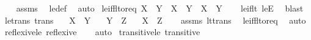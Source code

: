 \begin{isabellebody}
%
\isadelimproof
\ \ %
\endisadelimproof
%
\isatagproof
{}\isamarkupfalse%
\ assms\ \isamarkupfalse%
\ le{\isacharunderscore}{\kern0pt}def\ \isamarkupfalse%
\ auto%
\endisatagproof
{\isafoldproof}%
%
\isadelimproof
\isanewline
%
\endisadelimproof
\isanewline
{}\isamarkupfalse%
\ le{\isacharunderscore}{\kern0pt}iff{\isacharunderscore}{\kern0pt}lt{\isacharunderscore}{\kern0pt}or{\isacharunderscore}{\kern0pt}eq{\isacharcolon}{\kern0pt}\ {\isachardoublequoteopen}X\ {\isasymle}\ Y\ {\isasymlongleftrightarrow}\ X\ {\isacharless}{\kern0pt}\ Y\ {\isasymor}\ X\ {\isacharequal}{\kern0pt}\ Y{\isachardoublequoteclose}\isanewline
%
\isadelimproof
\ \ %
\endisadelimproof
%
\isatagproof
{}\isamarkupfalse%
\ le{\isacharunderscore}{\kern0pt}if{\isacharunderscore}{\kern0pt}lt\ leE\ \isamarkupfalse%
\ blast%
\endisatagproof
{\isafoldproof}%
%
\isadelimproof
\isanewline
%
\endisadelimproof
\isanewline
{}\isamarkupfalse%
\ le{\isacharunderscore}{\kern0pt}trans\ {\isacharbrackleft}{\kern0pt}trans{\isacharbrackright}{\kern0pt}{\isacharcolon}{\kern0pt}\isanewline
\ \ \ {\isachardoublequoteopen}X\ {\isasymle}\ Y{\isachardoublequoteclose}\isanewline
\ \ \ {\isachardoublequoteopen}Y\ {\isasymle}\ Z{\isachardoublequoteclose}\isanewline
\ \ \ {\isachardoublequoteopen}X\ {\isasymle}\ Z{\isachardoublequoteclose}\isanewline
%
\isadelimproof
\ \ %
\endisadelimproof
%
\isatagproof
{}\isamarkupfalse%
\ assms\ lt{\isacharunderscore}{\kern0pt}trans\ \isamarkupfalse%
\ le{\isacharunderscore}{\kern0pt}iff{\isacharunderscore}{\kern0pt}lt{\isacharunderscore}{\kern0pt}or{\isacharunderscore}{\kern0pt}eq\ \isamarkupfalse%
\ auto%
\endisatagproof
{\isafoldproof}%
%
\isadelimproof
\isanewline
%
\endisadelimproof
\isanewline
{}\isamarkupfalse%
\ reflexive{\isacharunderscore}{\kern0pt}le{\isacharcolon}{\kern0pt}\ {\isachardoublequoteopen}reflexive\ {\isacharparenleft}{\kern0pt}{\isasymle}{\isacharparenright}{\kern0pt}{\isachardoublequoteclose}%
\isadelimproof
\ %
\endisadelimproof
%
\isatagproof
{}\isamarkupfalse%
\ auto%
\endisatagproof
{\isafoldproof}%
%
\isadelimproof
%
\endisadelimproof
\isanewline
\isanewline
{}\isamarkupfalse%
\ transitive{\isacharunderscore}{\kern0pt}le{\isacharcolon}{\kern0pt}\ {\isachardoublequoteopen}transitive\ {\isacharparenleft}{\kern0pt}{\isasymle}{\isacharparenright}{\kern0pt}{\isachardoublequoteclose}\isanewline

\end{isabellebody}
